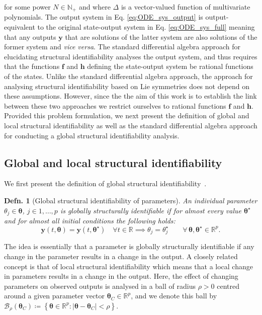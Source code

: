 \documentclass[12pt]{article}
\newtheorem{definition}{Defn.}
\begin{document}
for some power $N\in\mathbb{N}_{+}$ and where $\Delta$ is a vector-valued function of multivariate polynomials. The output system in Eq. \eqref{eq:ODE_sys_output} is output-equivalent to the original state-output system in Eq. \eqref{eq:ODE_sys_full} meaning that any outputs $\mathbf{y}$ that are solutions of the latter system are also solutions of the former system and \textit{vice versa}. The standard differential algebra approach for elucidating structural identifiability analyses the output system, and thus requires that the functions $\mathbf{f}$ and $\mathbf{h}$ defining the state-output system be rational functions of the states. Unlike the standard differential algebra approach, the approach for analysing structural identifiability based on Lie symmetries does not depend on these assumptions. However, since the the aim of this work is to establish the link between these two approaches we restrict ourselves to rational functions $\mathbf{f}$ and $\mathbf{h}$. Provided this problem formulation, we next present the definition of global and local structural identifiability as well as the standard differential algebra approach for conducting a global structural identifiability analysis. 


\subsection{Global and local structural identifiability}

We first present the definition of global structural identifiability~\cite{renardy2022structural,meshkat2015identifiability,meshkat2014repara}. 

\medskip
\begin{definition}[Global structural identifiability of parameters]
  An individual parameter $\theta_{j}\in\boldsymbol{\theta}$, ${j}\in{1,\ldots,p}$ is globally \textit{structurally identifiable} if for almost every value $\boldsymbol{\theta}^{\star}$ and for almost all initial conditions the following holds:
  \begin{equation}
    \mathbf{y}(t,\boldsymbol{\theta})=\mathbf{y}(t,\boldsymbol{\theta}^{\star})\quad\forall{t}\in\mathbb{R}\implies{\theta}_{j}=\theta_{j}^{\star}\quad\quad\forall\,\boldsymbol{\theta},\boldsymbol{\theta}^{\star}\in\mathbb{R}^{p}.
    \label{eq:structural identifiability}
  \end{equation}
\label{def:structural identifiability}
\end{definition}
The idea is essentially that a parameter is globally structurally identifiable if any change in the parameter results in a change in the output. A closely related concept is that of local structural identifiability which means that a local change in parameters results in a change in the output. Here, the effect of changing parameters on observed outputs is analysed in a ball of radius $\rho>0$ centred around a given parameter vector $\boldsymbol{\theta}_{C}\in\mathbb{R}^{p}$, and we denote this ball by $\mathcal{B}_{\rho}\left(\boldsymbol{\theta}_{C}\right)\coloneqq\left\{\boldsymbol{\theta}\in\mathbb{R}^{p}:|\boldsymbol{\theta}-\boldsymbol{\theta}_{C}|<\rho\right\}$.
\end{document}
